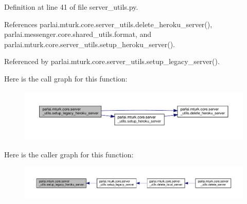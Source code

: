 Definition at line 41 of file server\+\_\+utils.\+py.



References parlai.\+mturk.\+core.\+server\+\_\+utils.\+delete\+\_\+heroku\+\_\+server(), parlai.\+messenger.\+core.\+shared\+\_\+utils.\+format, and parlai.\+mturk.\+core.\+server\+\_\+utils.\+setup\+\_\+heroku\+\_\+server().



Referenced by parlai.\+mturk.\+core.\+server\+\_\+utils.\+setup\+\_\+legacy\+\_\+server().

Here is the call graph for this function\+:
\nopagebreak
\begin{figure}[H]
\begin{center}
\leavevmode
\includegraphics[width=350pt]{namespaceparlai_1_1mturk_1_1core_1_1server__utils_adff2f564896069e0b76ae1b007515a2b_cgraph}
\end{center}
\end{figure}
Here is the caller graph for this function\+:
\nopagebreak
\begin{figure}[H]
\begin{center}
\leavevmode
\includegraphics[width=350pt]{namespaceparlai_1_1mturk_1_1core_1_1server__utils_adff2f564896069e0b76ae1b007515a2b_icgraph}
\end{center}
\end{figure}
\mbox{\label{namespaceparlai_1_1mturk_1_1core_1_1server__utils_afe9361009645f245de2a07c18cd485bb}} 
